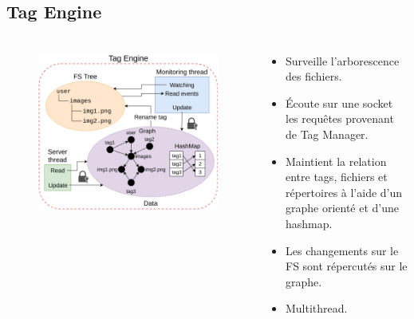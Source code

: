 \documentclass[10pt]{beamer}
\begin{document}
\subsection{Tag Engine}
\begin{frame}
    \frametitle{\subsecname}
    \begin{columns}[T]
        \begin{column}{.5\textwidth}
            \begin{center}
                \begin{figure}
                    \includegraphics[width=1\textwidth]{images/tag_engine2.png}
                \end{figure}
            \end{center}
        \end{column}
        \pause
        \begin{column}{.5\textwidth}
            \begin{itemize}
                \item Surveille l'arborescence des fichiers.
                \item Écoute sur une socket les requêtes provenant de Tag Manager.
                \item Maintient la relation entre tags, fichiers et répertoires à l'aide d'un graphe orienté et d'une hashmap.
                \item Les changements sur le FS sont répercutés sur le graphe.
                \item Multithread.
            \end{itemize}
        \end{column}
    \end{columns}
\end{frame}
\end{document}
